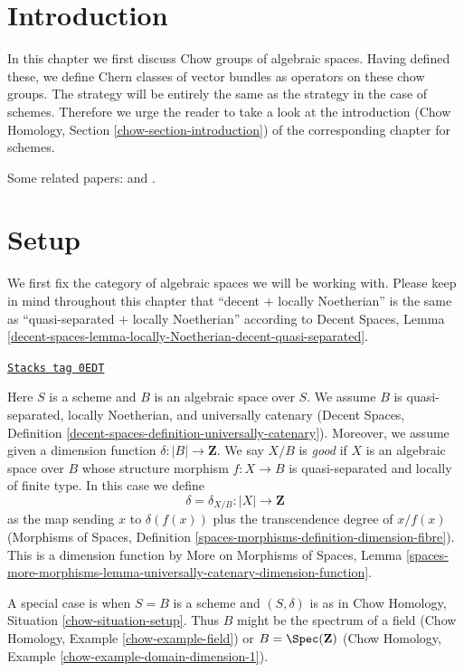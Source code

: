 \section{Introduction}
\label{spaces-chow-section-introduction}
In this chapter we first discuss Chow groups of algebraic spaces.
Having defined these, we define Chern classes of vector bundles as
operators on these chow groups. The strategy will be entirely
the same as the strategy in the case of schemes. Therefore we
urge the reader to take a look at the introduction
(Chow Homology, Section \ref{chow-section-introduction})
of the corresponding chapter for schemes.

\medskip\noindent
Some related papers: \cite{edidin-graham} and \cite{kresch_cycle}.

\section{Setup}
\label{spaces-chow-section-setup}
We first fix the category of algebraic spaces we will be working with.
Please keep in mind throughout this chapter that
``decent $+$ locally Noetherian'' is the same as
``quasi-separated $+$ locally Noetherian'' according to
Decent Spaces, Lemma
\ref{decent-spaces-lemma-locally-Noetherian-decent-quasi-separated}.

\begin{definition}
\label{spaces-chow-situation-setup}
\href{https://stacks.math.columbia.edu/tag/0EDT}{\texttt{Stacks tag 0EDT}}

Here $S$ is a scheme and $B$ is an algebraic space over $S$.
We assume $B$ is quasi-separated, locally Noetherian, and
universally catenary (Decent Spaces, Definition
\ref{decent-spaces-definition-universally-catenary}).
Moreover, we assume given a dimension function
$\delta : |B| \longrightarrow \mathbf{Z}$.
We say $X/B$ is {\it good} if $X$ is an algebraic space
over $B$ whose structure morphism $f : X \to B$ is
quasi-separated and locally of finite type.
In this case we define
$$
\delta = \delta_{X/B} : |X| \longrightarrow \mathbf{Z}
$$
as the map sending $x$ to $\delta(f(x))$ plus the transcendence degree
of $x/f(x)$ (Morphisms of Spaces, Definition
\ref{spaces-morphisms-definition-dimension-fibre}).
This is a dimension function by
More on Morphisms of Spaces, Lemma
\ref{spaces-more-morphisms-lemma-universally-catenary-dimension-function}.
\end{definition}

A special case is when $S = B$ is a scheme and $(S, \delta)$ is as in
Chow Homology, Situation \ref{chow-situation-setup}. Thus $B$ might be
the spectrum of a field (Chow Homology, Example \ref{chow-example-field})
or $B = \Spec(\mathbf{Z})$
(Chow Homology, Example \ref{chow-example-domain-dimension-1}).


